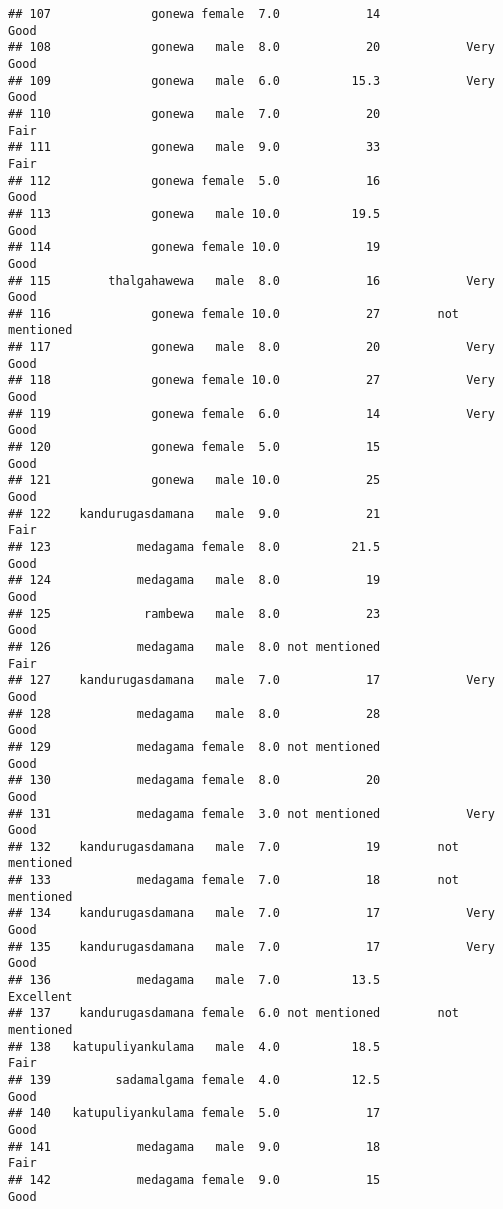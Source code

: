 \documentclass[
]{article}
\begin{document}
\begin{verbatim}
## 107              gonewa female  7.0            14                 Good
## 108              gonewa   male  8.0            20            Very Good
## 109              gonewa   male  6.0          15.3            Very Good
## 110              gonewa   male  7.0            20                 Fair
## 111              gonewa   male  9.0            33                 Fair
## 112              gonewa female  5.0            16                 Good
## 113              gonewa   male 10.0          19.5                 Good
## 114              gonewa female 10.0            19                 Good
## 115        thalgahawewa   male  8.0            16            Very Good
## 116              gonewa female 10.0            27        not mentioned
## 117              gonewa   male  8.0            20            Very Good
## 118              gonewa female 10.0            27            Very Good
## 119              gonewa female  6.0            14            Very Good
## 120              gonewa female  5.0            15                 Good
## 121              gonewa   male 10.0            25                 Good
## 122    kandurugasdamana   male  9.0            21                 Fair
## 123            medagama female  8.0          21.5                 Good
## 124            medagama   male  8.0            19                 Good
## 125             rambewa   male  8.0            23                 Good
## 126            medagama   male  8.0 not mentioned                 Fair
## 127    kandurugasdamana   male  7.0            17            Very Good
## 128            medagama   male  8.0            28                 Good
## 129            medagama female  8.0 not mentioned                 Good
## 130            medagama female  8.0            20                 Good
## 131            medagama female  3.0 not mentioned            Very Good
## 132    kandurugasdamana   male  7.0            19        not mentioned
## 133            medagama female  7.0            18        not mentioned
## 134    kandurugasdamana   male  7.0            17            Very Good
## 135    kandurugasdamana   male  7.0            17            Very Good
## 136            medagama   male  7.0          13.5            Excellent
## 137    kandurugasdamana female  6.0 not mentioned        not mentioned
## 138   katupuliyankulama   male  4.0          18.5                 Fair
## 139         sadamalgama female  4.0          12.5                 Good
## 140   katupuliyankulama female  5.0            17                 Good
## 141            medagama   male  9.0            18                 Fair
## 142            medagama female  9.0            15                 Good

\end{verbatim}
\end{document}
